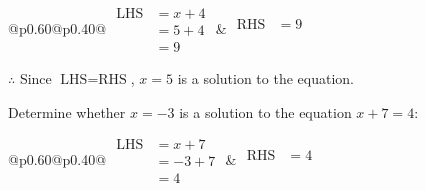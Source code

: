 \documentclass[12pt]{article}
\newcounter{minipagecount}
\begin{document}
\begin{multicols}{2}
\begin{minipage}[t]{0.40\textwidth}
    \noindent
    \renewcommand{\arraystretch}{1.3} %
    \begin{tabular}{@{}p{0.60\linewidth}@{}p{0.40\linewidth}@{}}
        \(\begin{aligned}
            \text{LHS} &= x + 4 \\
                    &= 5 + 4 \\
                    &= 9 
        \end{aligned}\) &
        \(\begin{aligned}
            \text{RHS} &= 9\\
                    & \\
                    &
        \end{aligned}\)
    \end{tabular}
    \renewcommand{\arraystretch}{1.0} %
    \vspace{2pt}  %

    \noindent \(\therefore\) Since \(\text{LHS} = \text{RHS}\), \(x = 5\) is  a solution to the equation.

\end{minipage}

\vspace*{0.5ex}
\vfill{}
\columnbreak
\noindent{(\theminipagecount)}\hspace{0.1mm} %
\begin{minipage}[t]{0.40\textwidth} %

    \noindent Determine whether \(x = -3\) is a solution to the equation \(x + 7 = 4\):
    \vspace{2pt}  %

    \noindent
    \renewcommand{\arraystretch}{1.3} %
    \begin{tabular}{@{}p{0.60\linewidth}@{}p{0.40\linewidth}@{}}
        \(\begin{aligned}
            \text{LHS} &= x + 7 \\
                    &= -3 + 7 \\
                    &= 4 
        \end{aligned}\) &
        \(\begin{aligned}
            \text{RHS} &= 4\\
                    & \\
                    &
        \end{aligned}\)
    \end{tabular}
    \renewcommand{\arraystretch}{1.0} %
    \vspace{2pt}  %


\end{minipage}
\end{multicols}
\end{document}
